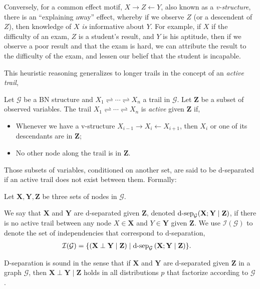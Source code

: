\documentclass{article}
\begin{document}
Conversely, for a common effect motif, $X\rightarrow Z\leftarrow Y$, also known as a \emph{v-structure}, there is an ``explaining away'' effect, whereby if we observe $Z$ (or a descendent of $Z$), then knowledge of $X$ \emph{is} informative about $Y$.
For example, if $X$ if the difficulty of an exam, $Z$ is a student's result, and $Y$ is his aptitude, then if we observe a poor result and that the exam is hard, we can attribute the result to the difficulty of the exam, and lessen our belief that the student is incapable.

This heuristic reasoning generalizes to longer trails in the concept of an \emph{active trail},
\begin{definition}
Let $\mathcal{G}$ be a BN structure and $X_1\rightleftharpoons\cdots\rightleftharpoons X_n$ a trail in $\mathcal{G}$.
Let $\mathbf{Z}$ be a subset of observed variables.
The trail $X_1\rightleftharpoons\cdots\rightleftharpoons X_n$ is \emph{active} given $\mathbf{Z}$ if,
\begin{itemize}
	\item Whenever we have a v-structure $X_{i-1}\rightarrow X_i\leftarrow X_{i+1}$, then $X_i$ or one of its descendants are in $\mathbf{Z}$;
	\item No other node along the trail is in $\mathbf{Z}$.
\end{itemize}
\end{definition}
Those subsets of variables, conditioned on another set, are said to be d-separated if an active trail does not exist between them.
Formally:
\begin{definition}
	Let $\mathbf{X}, \mathbf{Y}, \mathbf{Z}$ be three sets of nodes in $\mathcal{G}$.

We say that $\mathbf{X}$ and $\mathbf{Y}$ are d-separated given $\mathbf{Z}$, denoted $\textnormal{d-sep}_\mathcal{G}(\mathbf{X};\mathbf{Y}\mid\mathbf{Z})$, if there is no active trail between any node $X\in\mathbf{X}$ and $Y\in\mathbf{Y}$ given $\mathbf{Z}$.
We use $\mathcal{I}(\mathcal{G})$ to denote the set of independencies that correspond to d-separation,
	\begin{align*}
		\mathcal{I}(\mathcal{G}) &= \{\left(\mathbf{X}\perp\mathbf{Y}\mid\mathbf{Z}\right)\mid \textnormal{d-sep}_\mathcal{G}\left(\mathbf{X};\mathbf{Y}\mid\mathbf{Z}\right)\}.
	\end{align*}
\end{definition}

D-separation is sound in the sense that if $\mathbf{X}$ and $\mathbf{Y}$ are d-separated given $\mathbf{Z}$ in a graph $\mathcal{G}$, then $\mathbf{X}\perp\mathbf{Y}\mid\mathbf{Z}$ holds in all distributions $p$ that factorize according to $\mathcal{G}$ \citep[Theorem 3.3]{KollerFriedman2009}.
\end{document}
